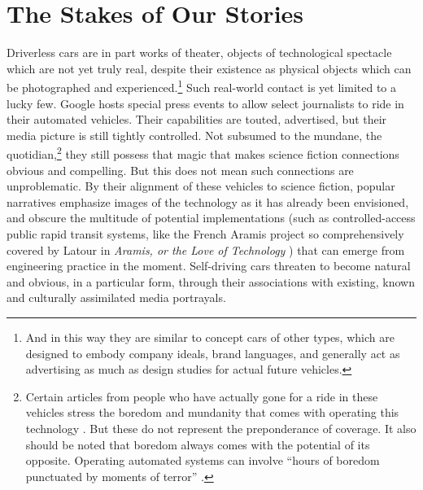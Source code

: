 \section{The Stakes of Our Stories}

Driverless cars
are in part works of theater, objects of technological spectacle which
are not yet truly real, despite their existence as physical objects
which can be photographed and experienced.\footnote{And in this way
  they are similar to concept cars of other types, which are designed
  to embody company ideals, brand languages, and generally act as
  advertising as much as design studies for actual future vehicles.}
Such real-world contact is 
yet limited to a lucky few. Google hosts special press events to allow
select journalists
to ride in their automated vehicles. Their capabilities are touted,
advertised, but their media picture is still tightly controlled. Not subsumed
to the mundane, the quotidian,\footnote{Certain articles from people
  who have actually gone for a ride in these vehicles stress the
  boredom and mundanity that comes with operating this
  technology \cite{rode500}. But these do not represent the
  preponderance of coverage. It also should be noted that boredom
  always comes with the potential of its opposite. Operating automated
systems can involve ``hours of boredom
punctuated by moments of terror'' \cite[p. 339]{sheridan}.} they still
possess that magic that 
makes science fiction connections obvious and compelling. But this
does not mean such connections are unproblematic. By
their alignment of these vehicles to science fiction, popular
narratives emphasize images of the technology as it has already been
envisioned, and obscure the multitude of potential implementations
(such as controlled-access public rapid transit systems, 
like the French Aramis
project so comprehensively covered by Latour in \emph{Aramis, or the
  Love of Technology} \cite{Aramis})
that can emerge from engineering practice in the moment. Self-driving
cars threaten to become natural and obvious, in a particular form,
through their associations with existing, known and culturally
assimilated media portrayals. 



